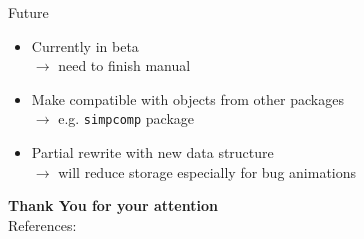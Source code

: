 \documentclass{beamer}
\numberwithin{equation}{aufgabe}
\begin{document}
\begin{frame}
    \begin{exampleblock}{Future}
        \begin{itemize}[label=-]
            \item Currently in beta\\
            $\xrightarrow{}$ need to finish manual \pause
            \item Make compatible with objects from other packages\\
            $\xrightarrow{}$ e.g. \texttt{simpcomp} package \pause
            \item Partial rewrite with new data structure\\
            $\xrightarrow{}$ will reduce storage especially for bug animations
        \end{itemize}
    \end{exampleblock}
\end{frame}


\begin{frame}
    \textbf{\Large Thank You for your attention}\\
    \bigskip
    References:\\
    \printbibliography
\end{frame}
\end{document}
